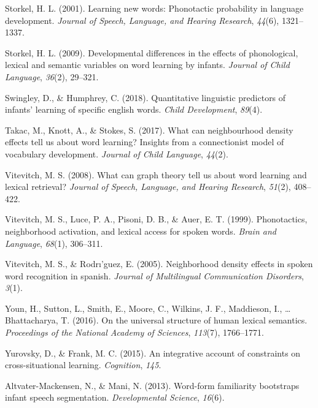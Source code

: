\documentclass[english,,man,floatsintext]{apa6}
\begin{document}
\leavevmode\hypertarget{ref-storkel2001}{}%
Storkel, H. L. (2001). Learning new words: Phonotactic probability in language development. \emph{Journal of Speech, Language, and Hearing Research}, \emph{44}(6), 1321--1337.

\leavevmode\hypertarget{ref-storkel2009}{}%
Storkel, H. L. (2009). Developmental differences in the effects of phonological, lexical and semantic variables on word learning by infants. \emph{Journal of Child Language}, \emph{36}(2), 29--321.

\leavevmode\hypertarget{ref-swingley2018}{}%
Swingley, D., \& Humphrey, C. (2018). Quantitative linguistic predictors of infants' learning of specific english words. \emph{Child Development}, \emph{89}(4).

\leavevmode\hypertarget{ref-takac2017}{}%
Takac, M., Knott, A., \& Stokes, S. (2017). What can neighbourhood density effects tell us about word learning? Insights from a connectionist model of vocabulary development. \emph{Journal of Child Language}, \emph{44}(2).

\leavevmode\hypertarget{ref-vitevitch2008}{}%
Vitevitch, M. S. (2008). What can graph theory tell us about word learning and lexical retrieval? \emph{Journal of Speech, Language, and Hearing Research}, \emph{51}(2), 408--422.

\leavevmode\hypertarget{ref-vitevitch1999}{}%
Vitevitch, M. S., Luce, P. A., Pisoni, D. B., \& Auer, E. T. (1999). Phonotactics, neighborhood activation, and lexical access for spoken words. \emph{Brain and Language}, \emph{68}(1), 306--311.

\leavevmode\hypertarget{ref-vitevitch2005}{}%
Vitevitch, M. S., \& Rodrı'guez, E. (2005). Neighborhood density effects in spoken word recognition in spanish. \emph{Journal of Multilingual Communication Disorders}, \emph{3}(1).

\leavevmode\hypertarget{ref-youn2016}{}%
Youn, H., Sutton, L., Smith, E., Moore, C., Wilkins, J. F., Maddieson, I., \ldots{} Bhattacharya, T. (2016). On the universal structure of human lexical semantics. \emph{Proceedings of the National Academy of Sciences}, \emph{113}(7), 1766--1771.

\leavevmode\hypertarget{ref-yurovsky2015}{}%
Yurovsky, D., \& Frank, M. C. (2015). An integrative account of constraints on cross-situational learning. \emph{Cognition}, \emph{145}.

\leavevmode\hypertarget{ref-altvater2013}{}%
Altvater-Mackensen, N., \& Mani, N. (2013). Word-form familiarity bootstraps infant speech segmentation. \emph{Developmental Science}, \emph{16}(6).
\end{document}
